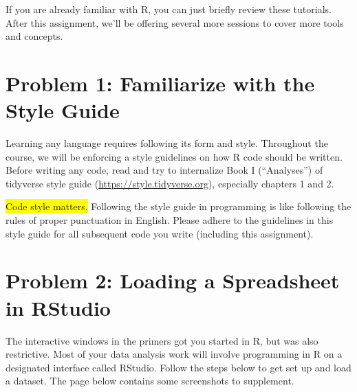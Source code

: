 \documentclass[11pt]{article}
\newcommand{\highlight}[1]{\colorbox{yellow}{#1}}
\begin{document}
\noindent If you are already familiar with R, you can just briefly
review these tutorials. After this assignment, we'll be offering several
more sessions to cover more tools and concepts.

\newpage

\hypertarget{problem-1-familiarize-with-the-style-guide}{%
\section*{Problem 1: Familiarize with the Style
Guide}\label{problem-1-familiarize-with-the-style-guide}}

Learning any language requires following its form and style. Throughout
the course, we will be enforcing a style guidelines on how R code should
be written. Before writing any code, read and try to internalize Book I
(``Analyses'') of tidyverse style guide
(\url{https://style.tidyverse.org}), especially chapters 1 and 2.

\bigskip

\noindent \highlight{Code style matters.} Following the style guide in
programming is like following the rules of proper punctuation in
English. Please adhere to the guidelines in this style guide for all
subsequent code you write (including this assignment).

\hypertarget{problem-2-loading-a-spreadsheet-in-rstudio}{%
\section*{Problem 2: Loading a Spreadsheet in
RStudio}\label{problem-2-loading-a-spreadsheet-in-rstudio}}

The interactive windows in the primers got you started in R, but was
also restrictive. Most of your data analysis work will involve
programming in R on a designated interface called RStudio. Follow the
steps below to get set up and load a dataset. The page below contains
some screenshots to supplement.
\end{document}
